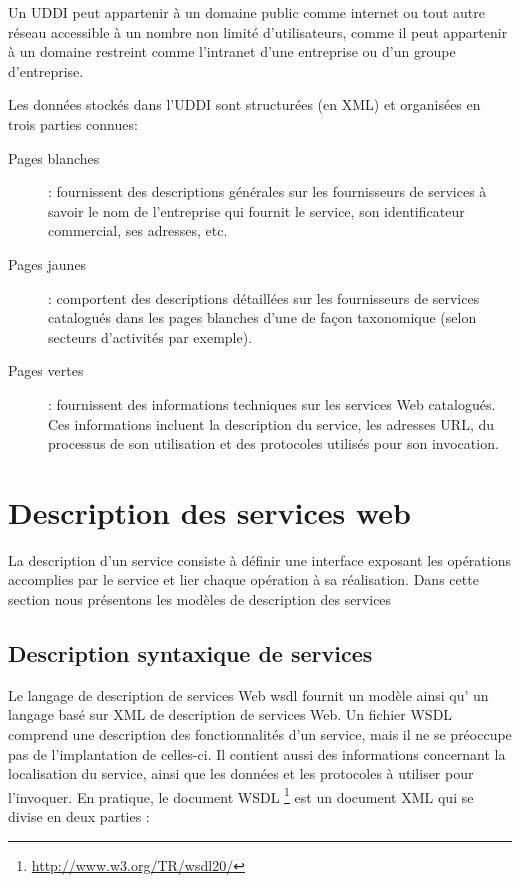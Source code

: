 	Un \textsc{UDDI} peut appartenir à un domaine public comme internet ou tout autre réseau accessible à un nombre
       	non limité d’utilisateurs, comme il peut appartenir à un domaine restreint comme l'intranet d’une entreprise 
	ou d'un groupe d'entreprise.

	Les données stockés dans l'UDDI sont structurées (en \textsc{XML}) et organisées en trois parties 
	connues:

	\begin{description} %
	    \item[Pages blanches]:
		fournissent des descriptions générales sur les fournisseurs de services à savoir le nom de 
		l'entreprise qui fournit le service, son identificateur commercial, ses adresses, etc.

	    \item[Pages jaunes]:
		comportent des descriptions détaillées sur les fournisseurs de services catalogués dans les pages 
		blanches d'une de façon taxonomique (selon secteurs d'activités par exemple).

	    \item[Pages vertes]:
		fournissent des informations techniques sur les services Web catalogués. Ces informations incluent 
		la description du service, les adresses \textsc{URL}, du processus de son utilisation 
		et des protocoles utilisés pour son invocation.

	\end{description}


\section{Description des services web} 
    La description d’un service consiste à définir une interface exposant les opérations accomplies par le service et 
    lier chaque opération à sa réalisation. Dans cette section nous présentons les modèles de description des services

    \cite{medjahed2004thesis}
    	\subsection{Description syntaxique de services}
	 \cite{baryannis2010}
	 Le langage de description de services Web \acrshort{wsdl} \cite{chinnici2007web} fournit un modèle ainsi
	 qu' un langage basé sur \textsc{XML} de description de services Web.  Un fichier \textsc{WSDL} comprend une 
	 description des fonctionnalités d'un service, mais il ne se préoccupe pas de l'implantation de celles-ci. 
	 Il contient aussi des informations concernant la localisation du service, ainsi que les données et les 
	 protocoles à utiliser pour l'invoquer. En pratique, le document \textsc{WSDL}
	 \footnote{\url{http://www.w3.org/TR/wsdl20/}} est un document \textsc{XML} qui se divise en 
	 deux parties \cite{elie2010}:


